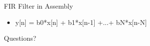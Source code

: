 \documentclass{beamer}
\begin{document}
\begin{frame}{FIR Filter in Assembly}
    \begin{itemize}
        \item y[n] = b0*x[n] + b1*x[n-1] +...+ bN*x[n-N]
    \end{itemize}
    \begin{center}
        {\tiny
            
        }
    \end{center}
\end{frame}


\begin{frame}{Questions?}
\end{frame}
\end{document}
